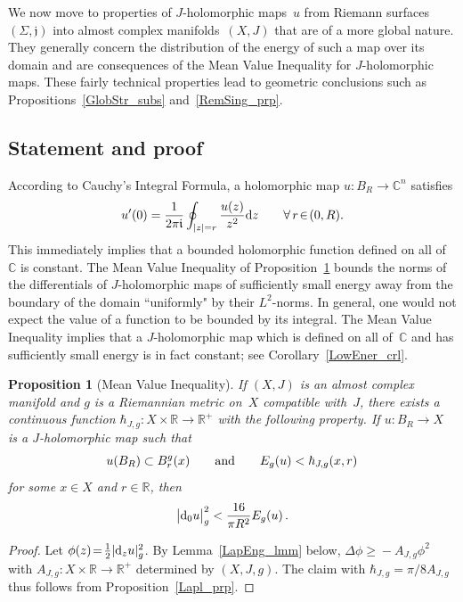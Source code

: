 \documentclass[11pt]{article}
\numberwithin{equation}{section}
\newtheorem{prp}[thm]{Proposition}
\theoremstyle{definition}
\def\BE#1{\begin{equation}\label{#1}}
\def\EE{\end{equation}}
\def\sf#1{\textsf{#1}}
\def\lra{\longrightarrow}
\def\C{\mathbb{C}}
\def\fI{\mathfrak i}
\def\fj{\mathfrak j}
\def\R{\mathbb R}
\def\De{\Delta}
\def\Si{\Sigma}
\def\hb{\hbar}
\def\nd{\textnormal{d}}
\begin{document}
\noindent
We now move to properties of $J$-holomorphic maps~$u$
from Riemann surfaces~$(\Si,\fj)$ into almost complex manifolds~$(X,J)$
that are of a more global nature.
They generally concern the distribution of the energy of such a map over its domain
and are consequences of the \sf{Mean Value Inequality} for $J$-holomorphic maps.
These fairly technical properties lead to geometric conclusions
such as Propositions~\ref{GlobStr_subs} and~\ref{RemSing_prp}.



\subsection{Statement and proof}
\label{MeanValIn_subs}

\noindent
According to Cauchy's Integral Formula, a holomorphic map $u\!:B_R\!\lra\!\C^n$ satisfies
$$u'(0)=\frac{1}{2\pi\fI}\oint_{|z|=r}\frac{u(z)}{z^2}\nd z
\qquad\forall\,r\!\in\!(0,R).$$
This immediately implies that a bounded holomorphic function defined on all of~$\C$ is constant.
The Mean Value Inequality of Proposition~\ref{PtBnd_prp}
bounds the norms of the differentials of 
$J$-holomorphic maps of sufficiently small energy away from the boundary of the domain ``uniformly"
by their $L^2$-norms.
In general, one would not expect the value of a function to be bounded 
by its integral.
The Mean Value Inequality implies that a $J$-holomorphic map
which is defined on all of~$\C$ and has sufficiently small energy is in fact constant;
see Corollary~\ref{LowEner_crl}.


\begin{prp}[Mean Value Inequality]\label{PtBnd_prp}
If $(X,J)$ is an almost complex manifold and $g$ is a Riemannian metric on~$X$
compatible with~$J$,  there exists a continuous function 
\hbox{$\hb_{J,g}\!:X\!\times\!\R\!\lra\!\R^+$} with the following property. 
If \hbox{$u\!:B_R\!\lra\!X$} is a $J$-holomorphic map such that 
$$u(B_R)\subset B_r^g(x) \qquad\hbox{and}\qquad
E_g(u)<\hb_{J,g}(x,r)$$
for some $x\!\in\!X$ and $r\!\in\!\R$, then
\BE{PtBnd_e} \big|\nd_0u\big|_g^2<\frac{16}{\pi R^2} E_g(u)\,.\EE
\end{prp}

\begin{proof}
Let $\phi(z)\!=\!\frac12|\nd_zu|_g^2$. 
By Lemma~\ref{LapEng_lmm} below, $\De\phi\!\ge\!-A_{J,g}\phi^2$ with 
\hbox{$A_{J,g}\!:X\!\times\!\R\!\lra\!\R^+$} determined by $(X,J,g)$. 
The claim with $\hb_{J,g}\!=\!\pi/8A_{J,g}$ thus follows from Proposition~\ref{Lapl_prp}.
\end{proof}
\end{document}
